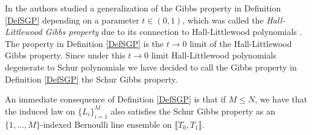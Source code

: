 \begin{remark} In \cite{CD} the authors studied a generalization of the Gibbs property in Definition \ref{DefSGP} depending on a parameter $t \in (0,1)$, which was called the {\em Hall-Littlewood Gibbs property} due to its connection to Hall-Littlewood polynomials \cite{Mac}. The property in Definition \ref{DefSGP} is the $t \rightarrow 0$ limit of the Hall-Littlewood Gibbs property. Since under this $t \rightarrow 0$ limit Hall-Littlewood polynomials degenerate to Schur polynomials we have decided to call the Gibbs property in Definition \ref{DefSGP} the Schur Gibbs property.
\end{remark}
\begin{remark} \label{restrict}  An immediate consequence of Definition \ref{DefSGP} is that if $M \leq N$, we have that the induced law on $\{L_i\}_{i = 1}^M$ also satisfies the Schur Gibbs property as an $\{1,\dots,M\}$-indexed Bernoulli line ensemble on $\llbracket T_0, T_1 \rrbracket$.
\end{remark}

